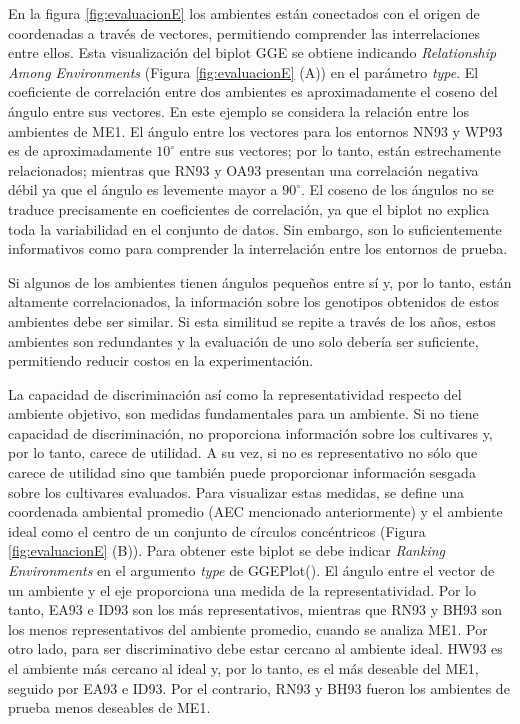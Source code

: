 En la figura \ref{fig:evaluacionE} los ambientes están conectados con el origen de coordenadas a través de vectores, permitiendo comprender las interrelaciones entre ellos.  Esta visualización del biplot GGE se obtiene indicando \emph{Relationship Among Environments} (Figura \ref{fig:evaluacionE} (A)) en el parámetro \emph{type}. El coeficiente de correlación entre dos ambientes es aproximadamente el coseno del ángulo entre sus vectores. 
En este ejemplo se considera la relación entre los ambientes de ME1. El ángulo entre los vectores para los entornos NN93 y WP93 es de aproximadamente $10^{\circ}$ entre sus vectores; por lo tanto, están estrechamente relacionados; mientras que RN93 y OA93 presentan una correlación negativa débil ya que el ángulo es levemente mayor a $90^{\circ}$. El coseno de los ángulos no se traduce precisamente en coeficientes de correlación, ya que el biplot no explica toda la variabilidad en el conjunto de datos. Sin embargo, son lo suficientemente informativos como para comprender la interrelación entre los entornos de prueba. 

Si algunos de los ambientes tienen ángulos pequeños entre sí y, por lo tanto, están altamente correlacionados, la información sobre los genotipos obtenidos de estos ambientes debe ser similar. Si esta similitud se repite a través de los años, estos ambientes son redundantes y la evaluación de uno solo debería ser suficiente, permitiendo reducir costos en la experimentación.


La capacidad de discriminación así como la representatividad respecto del ambiente objetivo, son medidas fundamentales para un ambiente. Si no tiene capacidad de discriminación, no proporciona información sobre los cultivares y, por lo tanto, carece de utilidad. A su vez, si no es representativo no sólo que carece de utilidad sino que también puede proporcionar información sesgada sobre los cultivares evaluados. Para visualizar estas medidas, se define una coordenada ambiental promedio (AEC mencionado anteriormente) y el ambiente ideal como el centro de un conjunto de círculos concéntricos (Figura \ref{fig:evaluacionE} (B)). Para obtener este biplot se debe indicar \emph{Ranking Environments} en el argumento \emph{type} de \textcolor{fandango}{GGEPlot()}. El ángulo entre el vector de un ambiente y el eje proporciona una medida de la representatividad. Por lo tanto, EA93 e ID93 son los más representativos, mientras que RN93 y BH93 son los menos representativos del ambiente promedio, cuando se analiza ME1. Por otro lado, para ser discriminativo debe estar cercano al ambiente ideal. HW93 es el ambiente más cercano al ideal y, por lo tanto, es el más deseable del ME1, seguido por EA93 e ID93. Por el contrario, RN93 y BH93 fueron los ambientes de prueba menos deseables de ME1.  \\

